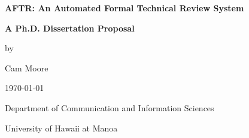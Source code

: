 
\begin{titlepage}
\begin{center}
  
  \vspace{1.5in}
  
  {\Large\bf AFTR:  An Automated Formal Technical Review System}
  
  \vspace{0.5in}
  
  {\large\bf A Ph.D. Dissertation Proposal}
  
  \vspace{0.5in}
  
  
  by   
  
  \vspace{.2in}
  
  {\large  Cam Moore}
  
  \vspace{4.5in}
 
  \today
  
  \vfill
  
  {\sc Department of Communication and Information Sciences
  
  University of Hawaii at Manoa}
\end{center}
\end{titlepage}
